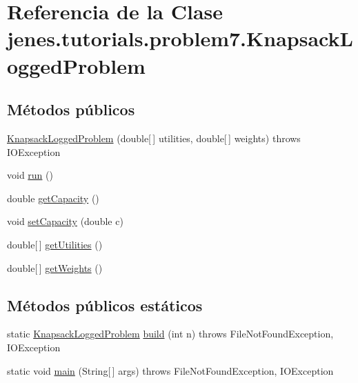 \hypertarget{classjenes_1_1tutorials_1_1problem7_1_1_knapsack_logged_problem}{\section{Referencia de la Clase jenes.\-tutorials.\-problem7.\-Knapsack\-Logged\-Problem}
\label{classjenes_1_1tutorials_1_1problem7_1_1_knapsack_logged_problem}
}
\subsection*{Métodos públicos}
\begin{DoxyCompactItemize}
\item 
\hyperlink{classjenes_1_1tutorials_1_1problem7_1_1_knapsack_logged_problem_a0ab9bce9861fb1a721cb682910fec3dc}{Knapsack\-Logged\-Problem} (double\mbox{[}$\,$\mbox{]} utilities, double\mbox{[}$\,$\mbox{]} weights)  throws I\-O\-Exception 
\item 
void \hyperlink{classjenes_1_1tutorials_1_1problem7_1_1_knapsack_logged_problem_a433dd1c6435246eec5fdead858ef3237}{run} ()
\item 
double \hyperlink{classjenes_1_1tutorials_1_1problem7_1_1_knapsack_logged_problem_adac9e9311a429d0c41e8d4c9d7a1afb6}{get\-Capacity} ()
\item 
void \hyperlink{classjenes_1_1tutorials_1_1problem7_1_1_knapsack_logged_problem_a7aad6283e4dcd58ee08550a6682c747d}{set\-Capacity} (double c)
\item 
double\mbox{[}$\,$\mbox{]} \hyperlink{classjenes_1_1tutorials_1_1problem7_1_1_knapsack_logged_problem_aa5a5916fe82cdf200e5f9210d673dc35}{get\-Utilities} ()
\item 
double\mbox{[}$\,$\mbox{]} \hyperlink{classjenes_1_1tutorials_1_1problem7_1_1_knapsack_logged_problem_a23b4289088720e543640ae4f1743a129}{get\-Weights} ()
\end{DoxyCompactItemize}
\subsection*{Métodos públicos estáticos}
\begin{DoxyCompactItemize}
\item 
static \hyperlink{classjenes_1_1tutorials_1_1problem7_1_1_knapsack_logged_problem}{Knapsack\-Logged\-Problem} \hyperlink{classjenes_1_1tutorials_1_1problem7_1_1_knapsack_logged_problem_a541dbb7113b95fa6e579502e847ac36f}{build} (int n)  throws File\-Not\-Found\-Exception, I\-O\-Exception 
\item 
static void \hyperlink{classjenes_1_1tutorials_1_1problem7_1_1_knapsack_logged_problem_ab2896c85405a58a8a2c3474375bf2ac8}{main} (String\mbox{[}$\,$\mbox{]} args)  throws File\-Not\-Found\-Exception, I\-O\-Exception 
\end{DoxyCompactItemize}


